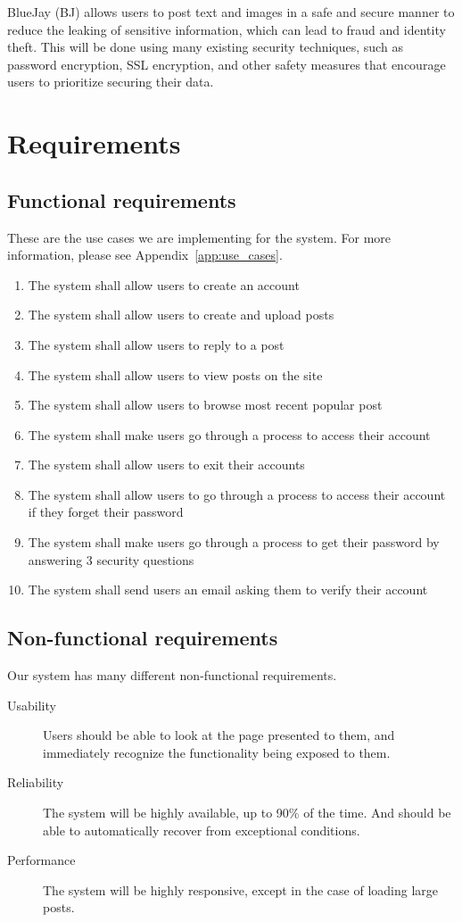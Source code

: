\documentclass{report}
\begin{document}
	BlueJay (BJ) allows users to post text and images in a safe and secure manner to reduce the leaking of sensitive information,
	which can lead to fraud and identity theft.
	This will be done using many existing security techniques, such as password encryption, SSL encryption,
	and other safety measures that encourage users to prioritize securing their data.
\section{Requirements}
	\subsection{Functional requirements}
	These are the use cases we are implementing for the system.
	For more information, please see Appendix~\ref{app:use_cases}.
	\begin{enumerate}
		\item The system shall allow users to create an account
		\item The system shall allow users to create and upload posts
		\item The system shall allow users to reply to a post
		\item The system shall allow users to view posts on the site
		\item The system shall allow users to browse most recent popular post
		\item The system shall make users go through a process to access their account
		\item The system shall allow users to exit their accounts
		\item The system shall allow users to go through a process to access their account if they forget their password
		\item The system shall make users go through a process to get their password by answering 3 security questions
		\item The system shall send users an email asking them to verify their account
	\end{enumerate}
	\subsection{Non-functional requirements}
	Our system has many different non-functional requirements.
	\begin{description}
		\item [Usability] Users should be able to look at the page presented to them,
		and immediately recognize the functionality being exposed to them.
		\item [Reliability] The system will be highly available, up to 90\% of the time.
		And should be able to automatically recover from exceptional conditions.
		\item [Performance] The system will be highly responsive,
		except in the case of loading large posts.
	\end{description}
\end{document}
